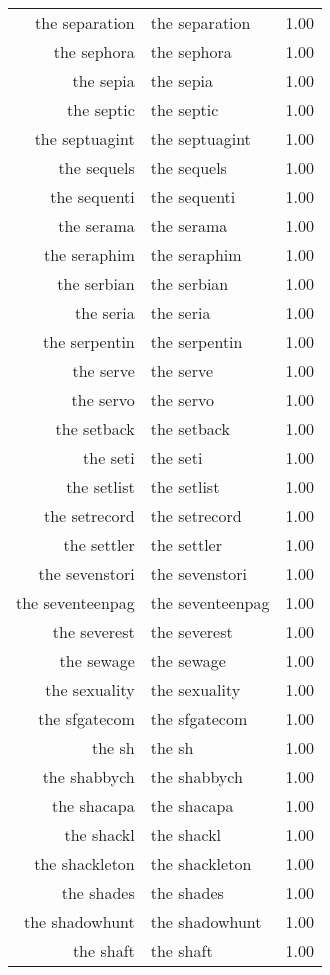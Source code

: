 \begin{table}[ht]
\begin{tabular}{rlr}
  the separation & the separation & 1.00 \\ 
  the sephora & the sephora & 1.00 \\ 
  the sepia & the sepia & 1.00 \\ 
  the septic & the septic & 1.00 \\ 
  the septuagint & the septuagint & 1.00 \\ 
  the sequels & the sequels & 1.00 \\ 
  the sequenti & the sequenti & 1.00 \\ 
  the serama & the serama & 1.00 \\ 
  the seraphim & the seraphim & 1.00 \\ 
  the serbian & the serbian & 1.00 \\ 
  the seria & the seria & 1.00 \\ 
  the serpentin & the serpentin & 1.00 \\ 
  the serve & the serve & 1.00 \\ 
  the servo & the servo & 1.00 \\ 
  the setback & the setback & 1.00 \\ 
  the seti & the seti & 1.00 \\ 
  the setlist & the setlist & 1.00 \\ 
  the setrecord & the setrecord & 1.00 \\ 
  the settler & the settler & 1.00 \\ 
  the sevenstori & the sevenstori & 1.00 \\ 
  the seventeenpag & the seventeenpag & 1.00 \\ 
  the severest & the severest & 1.00 \\ 
  the sewage & the sewage & 1.00 \\ 
  the sexuality & the sexuality & 1.00 \\ 
  the sfgatecom & the sfgatecom & 1.00 \\ 
  the sh & the sh & 1.00 \\ 
  the shabbych & the shabbych & 1.00 \\ 
  the shacapa & the shacapa & 1.00 \\ 
  the shackl & the shackl & 1.00 \\ 
  the shackleton & the shackleton & 1.00 \\ 
  the shades & the shades & 1.00 \\ 
  the shadowhunt & the shadowhunt & 1.00 \\ 
  the shaft & the shaft & 1.00 \\ 

\end{tabular}
\end{table}
